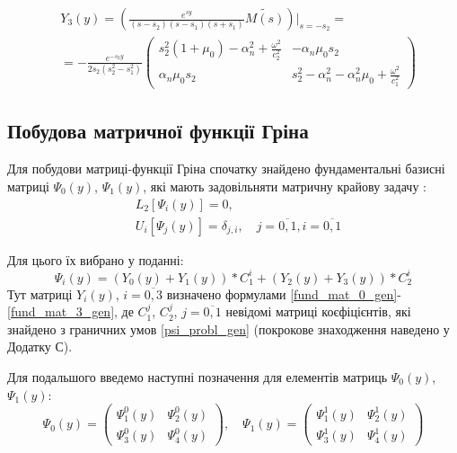 \begin{align}\label{fund_mat_3_gen}
    &Y_3(y) =  \left( \frac{e^{sy}}{(s-s_2)(s - s_1)(s + s_1)} \widetilde{M(s)} \right) \Big|_{s=-s_2} = \nonumber \\
    &=-\frac{e^{-s_2 y}}{2s_2 (s_2^2 - s_1^2)} \begin{pmatrix}
        s_2^2 (1 + \mu_0) -\alpha_n^2 + \frac{\omega^2}{c_2^2} & -\alpha_n \mu_0 s_2 \\
        \alpha_n \mu_0 s_2 & s_2^2 - \alpha_n^2 - \alpha_n^2\mu_0 + \frac{\omega^2}{c_1^2}
    \end{pmatrix}
\end{align}

\subsection{Побудова матричної функції Гріна}
Для побудови матриці-функції Гріна спочатку знайдено фундаментальні базисні матриці $\Psi_0(y)$, $\Psi_1(y)$, які мають задовільняти матричну крайову задачу \cite{popov_2}:
\begin{align}\label{psi_probl_gen}
    &L_2\left[ \Psi_i(y) \right] = 0, \nonumber \\
    &U_i\left[ \Psi_j(y) \right] = \delta_{j,i}, \quad j= \overline{0, 1}, i= \overline{0, 1}
\end{align}

Для цього їх вибрано у поданні:
\begin{equation}\label{psi_gen}
    \Psi_i(y) = \left( Y_0(y) + Y_1(y) \right) * C_1^i + \left( Y_2(y) + Y_3(y) \right) * C_2^i
\end{equation}
Тут матриці $Y_i(y)$, $i=\overline{0, 3}$ визначено формулами \eqref{fund_mat_0_gen}-\eqref{fund_mat_3_gen}, де $C_1^j$, $C_2^j$, $j=\overline{0, 1}$ невідомі матриці коєфіцієнтів, які знайдено з граничних умов \eqref{psi_probl_gen}
(покрокове знаходження наведено у Додатку С).

Для подальшого введемо наступні позначення для елементів матриць $\Psi_0(y)$, $\Psi_1(y)$:
\begin{equation*}
    \Psi_0(y) = \begin{pmatrix}
        \Psi_1^0(y) &  \Psi_2^0(y) \\
        \Psi_3^0(y) &  \Psi_4^0(y) 
    \end{pmatrix}, \quad 
    \Psi_1(y) = \begin{pmatrix}
        \Psi_1^1(y) &  \Psi_2^1(y) \\
        \Psi_3^1(y) &  \Psi_4^1(y) 
    \end{pmatrix}      
\end{equation*}

